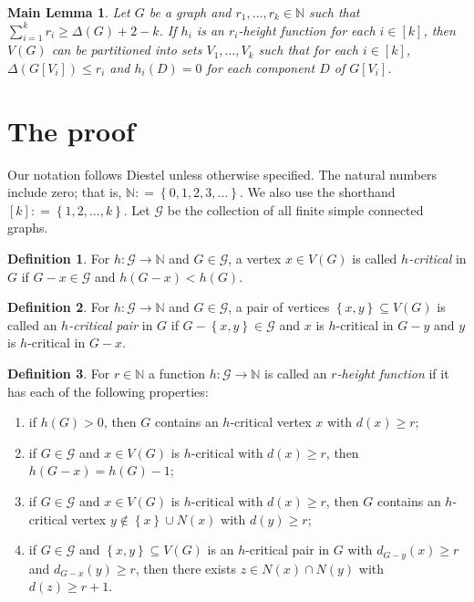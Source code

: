 \documentclass[12pt]{amsart}
\theoremstyle{plain}
\newtheorem*{MainLemma}{Main Lemma}
\theoremstyle{definition}
\newtheorem{defn}{Definition}
\theoremstyle{remark}
\newcommand{\fancy}[1]{\mathcal{#1}}
\newcommand{\IN}{\mathbb{N}}
\newcommand{\G}{\fancy{G}}
\newcommand{\set}[1]{\left\{ #1 \right\}}
\newcommand{\func}[3]{#1\colon #2 \rightarrow #3}
\newcommand{\irange}[1]{\left[#1\right]}
\newcommand{\DefinedAs}{\mathrel{\mathop:}=}
\begin{document}
\begin{MainLemma}
Let $G$ be a graph and $r_1, \ldots, r_k \in \IN$ such that $\sum_{i=1}^k r_i \geq \Delta(G) + 2 - k$. If $h_i$ is an $r_i$-height function for each $i \in \irange{k}$, then $V(G)$ can be partitioned into sets $V_1, \ldots, V_k$ such that for each $i \in \irange{k}$, $\Delta(G[V_i]) \leq r_i$ and $h_i(D) = 0$ for each component $D$ of $G[V_i]$.
\end{MainLemma}

\section{The proof}
Our notation follows Diestel \cite{Diestel} unless otherwise specified.  The natural numbers include zero; that is, $\IN \DefinedAs \set{0, 1, 2, 3, \ldots}$.  We also use the shorthand $\irange{k} \DefinedAs \set{1, 2, \ldots, k}$. Let $\G$ be the collection of all finite simple connected graphs.

\begin{defn}
For $\func{h}{\G}{\IN}$ and $G \in \G$, a vertex $x \in V(G)$ is called \emph{$h$-critical} in $G$ if $G - x \in \G$ and $h(G-x) < h(G)$.
\end{defn}

\begin{defn}
For $\func{h}{\G}{\IN}$ and $G \in \G$, a pair of vertices $\set{x,y} \subseteq V(G)$ is called an \emph{$h$-critical pair} in $G$ if $G - \set{x,y} \in \G$ and $x$ is $h$-critical in $G-y$ and $y$ is $h$-critical in $G-x$.
\end{defn}

\begin{defn}
For $r \in \IN$ a function $\func{h}{\G}{\IN}$ is called an \emph{$r$-height function} if it has each of the following properties:
\begin{enumerate}
\item if $h(G) > 0$, then $G$ contains an $h$-critical vertex $x$ with $d(x) \geq r$;
\item if $G \in \G$ and $x \in V(G)$ is $h$-critical with $d(x) \geq r$, then $h(G-x) = h(G) - 1$;
\item if $G \in \G$ and $x \in V(G)$ is $h$-critical with $d(x) \geq r$, then $G$ contains an $h$-critical vertex $y \not \in \set{x} \cup N(x)$ with $d(y) \geq r$;
\item if $G \in \G$ and $\set{x, y} \subseteq V(G)$ is an $h$-critical pair in $G$ with $d_{G-y}(x) \geq r$ and $d_{G-x}(y) \geq r$, then there exists $z \in N(x) \cap N(y)$ with $d(z) \geq r + 1$.
\end{enumerate}
\end{defn}
\end{document}
